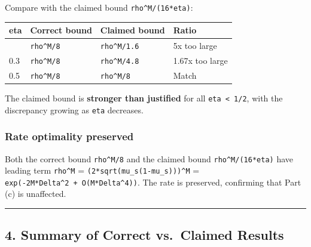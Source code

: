 \documentclass[
  12pt,
]{article}
\begin{document}
Compare with the claimed bound \texttt{rho\^{}M/(16*eta)}:

\begin{longtable}[]{@{}llll@{}}
\toprule\noalign{}
eta & Correct bound & Claimed bound & Ratio \\
\midrule\noalign{}
\endhead
\bottomrule\noalign{}
\endlastfoot
0.1 & \texttt{rho\^{}M/8} & \texttt{rho\^{}M/1.6} & 5x too large \\
0.3 & \texttt{rho\^{}M/8} & \texttt{rho\^{}M/4.8} & 1.67x too large \\
0.5 & \texttt{rho\^{}M/8} & \texttt{rho\^{}M/8} & Match \\
\end{longtable}

The claimed bound is \textbf{stronger than justified} for all
\texttt{eta\ \textless{}\ 1/2}, with the discrepancy growing as
\texttt{eta} decreases.

\subsubsection{Rate optimality
preserved}\label{rate-optimality-preserved}

Both the correct bound \texttt{rho\^{}M/8} and the claimed bound
\texttt{rho\^{}M/(16*eta)} have leading term \texttt{rho\^{}M} =
\texttt{(2*sqrt(mu\_s(1-mu\_s)))\^{}M} =
\texttt{exp(-2M*Delta\^{}2\ +\ O(M*Delta\^{}4))}. The rate is preserved,
confirming that Part (c) is unaffected.

\begin{center}\rule{0.5\linewidth}{0.5pt}\end{center}

\subsection{4. Summary of Correct vs.~Claimed
Results}\label{summary-of-correct-vs.-claimed-results}
\end{document}
